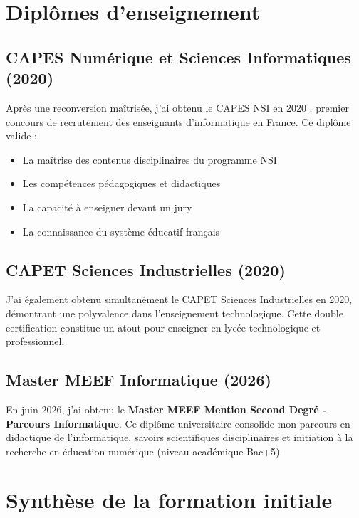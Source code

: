 \section{Diplômes d'enseignement}

\subsection{CAPES Numérique et Sciences Informatiques (2020)}

Après une reconversion maîtrisée, j'ai obtenu le CAPES NSI en 2020 \parencite{capes_nsi}, premier concours de recrutement des enseignants d'informatique en France. Ce diplôme valide :

\begin{itemize}[leftmargin=*]
    \item La maîtrise des contenus disciplinaires du programme NSI
    \item Les compétences pédagogiques et didactiques
    \item La capacité à enseigner devant un jury
    \item La connaissance du système éducatif français
\end{itemize}

\subsection{CAPET Sciences Industrielles (2020)}

J'ai également obtenu simultanément le CAPET Sciences Industrielles en 2020, démontrant une polyvalence dans l'enseignement technologique. Cette double certification constitue un atout pour enseigner en lycée technologique et professionnel.

\subsection{Master MEEF Informatique (2026)}

En juin 2026, j'ai obtenu le \textbf{Master MEEF Mention Second Degré - Parcours Informatique}. Ce diplôme universitaire consolide mon parcours en didactique de l'informatique, savoirs scientifiques disciplinaires et initiation à la recherche en éducation numérique (niveau académique Bac+5).

\section{Synthèse de la formation initiale}

